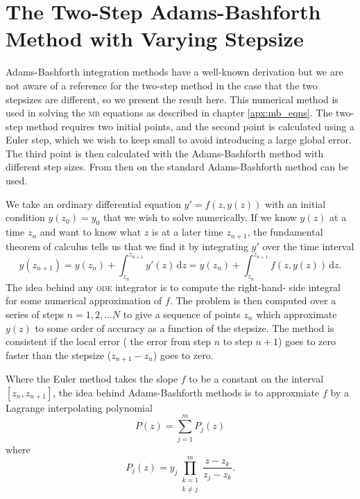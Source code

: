\chapter[The Two-Step Adams-Bashforth Method]
  {The Two-Step Adams-Bashforth\\ Method with Varying Stepsize}
  \label{apx:ab_method}

    Adams-Bashforth integration methods have a well-known derivation but we are
    not aware of a reference for the two-step method in the case that the two
    stepsizes are different, so we present the result here. This numerical
    method is used in solving the \textsc{mb} equations as described in
    chapter \ref{apx:mb_eqns}. The two-step method requires two initial points,
    and  the second point is calculated using a Euler step, which we wish to
    keep small to avoid introducing a large global error. The third point is
    then calculated with the Adams-Bashforth method with different step sizes.
    From then on the standard Adams-Bashforth method can be used.

    We take an ordinary differential equation $y' = f(z,y(z))$ with an initial
    condition $y(z_0) = y_0$ that we wish to solve numerically. If we know
    $y(z)$ at a time $z_n$ and want to know what $z$ is at a later time
    $z_{n+1}$, the fundamental theorem of calculus tells us that we find it by
    integrating $y'$ over the time interval
    \begin{equation}\label{eqn:fund_thrm_calculus}
      y(z_{n+1}) = y(z_n) + \int_{z_n}^{z_{n+1}} \! y'(z) \, 
      \mathrm{d}z = y(z_n) + \int_{z_n}^{z_{n+1}} \! f(z,y(z)) \, \mathrm{d}z.
    \end{equation}
    The idea behind any \textsc{ode} integrator is to compute the right-hand-
    side integral for some numerical approximation of $f$. The problem is then
    computed over a series of steps $n = 1, 2, \dots N$ to give a sequence of
    points $z_n$ which approximate $y(z)$ to some order of accuracy as a
    function of the stepsize. The method is consistent if the local error (\ie
    the error from step $n$ to step $n+1$) goes to zero faster than the stepsize
    ($z_{n+1} - z_n$) goes to zero.

    Where the Euler method takes the slope $f$ to be a constant on the interval
    $[z_n, z_{n+1}]$, the idea behind Adams-Bashforth methods is to approxmiate
    $f$ by a Lagrange interpolating polynomial\cite{arfken2005mathematical}
    \begin{equation}
      P(z) = \sum_{j=1}^{m}{P_j(z)} 
    \end{equation}
    where
    \begin{equation}
      P_j(z) = y_j \prod_{\substack{k=1 \\ k \ne j}}^{m}{ 
      \frac{z - z_k}{z_j - z_k} }.
    \end{equation}


